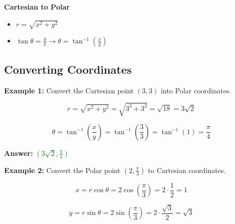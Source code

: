\documentclass[10pt]{article}                               %
\begin{document}
\begin{adjustwidth}{2em}{0pt}
\begin{adjustwidth}{2em}{0pt}
        \vspace{0.5em}

        \textbf{Cartesian to Polar}

        \begin{itemize}
            \item \( r = \sqrt{x^2 + y^2} \)
            \item \( \tan\theta = \frac{y}{x}  \rightarrow  \theta = \tan^{-1}\left(\frac{x}{y}\right) \)
        \end{itemize}

        \vspace{0.5em}


        \begin{examplebox}

            \subsection*{Converting Coordinates}

            \textbf{Example 1:} Convert the Cartesian point \( \left(3,3\right) \) into Polar coordinates.
            \vspace{0.5em}

            \begin{adjustwidth}{2em}{0pt}

                \[ r = \sqrt{x^2 + y^2} = \sqrt{3^2 + 3^2} = \sqrt{18} = 3\sqrt{2} \]

                \[ \theta = \tan^{-1}\left(\frac{x}{y}\right) = \tan^{-1}\left(\frac{3}{3}\right) = \tan^{-1}(1) = \frac{\pi}{4} \]

                \textbf{Answer:} \textcolor{darkgreen}{\( \left(3\sqrt{2}, \frac{\pi}{4}\right) \)}

            \end{adjustwidth}

            \vspace{1em}

            \textbf{Example 2:} Convert the Polar point \( \left(2, \frac{\pi}{3}\right) \) to Cartesian coordinates.
            \vspace{0.5em}

            \begin{adjustwidth}{2em}{0pt}

                \[ x = r\cos\theta = 2\cos\left(\frac{\pi}{3}\right) = 2 \cdot \frac{1}{2} = 1 \]

                \[ y = r\sin\theta = 2\sin\left(\frac{\pi}{3}\right) = 2 \cdot \frac{\sqrt{3}}{2} = \sqrt{3} \]


\end{adjustwidth}
\end{examplebox}
\end{adjustwidth}
\end{adjustwidth}
\end{document}
